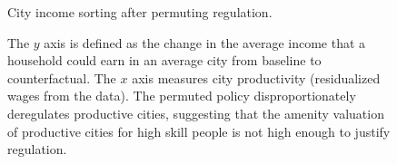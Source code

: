 \documentclass[12pt]{article}
\begin{document}
	
	\begin{landscape}
	\begin{figure}[htbp!]
		\begin{center}
			\caption{City income sorting after permuting regulation.}\label{figure:city_inc_sorting_optPolicy}
			
			\caption*{The $y$ axis is defined as the change in the average income that a household could earn in an average city from baseline to counterfactual. The $x$ axis measures city productivity (residualized wages from the data). The permuted policy disproportionately deregulates productive cities, suggesting that the amenity valuation of productive cities for high skill people is not high enough to justify regulation. }
		\end{center}
	\end{figure}
\end{landscape}
	
	
	
	
	
\end{document}
